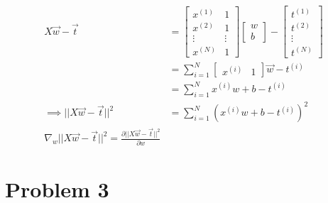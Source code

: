 \documentclass{article}
\begin{document}
\subsection{}

\begin{align*}
X\vec{w} - \vec{t} &=  \begin{bmatrix} x^{(1)} & 1 \\ x^{(2)} & 1 \\ \vdots & \vdots \\ x^{(N)} & 1 \end{bmatrix}  \begin{bmatrix} w \\ b \end{bmatrix} -  \begin{bmatrix} t^{(1)} \\ t^{(2)} \\ \vdots \\ t^{(N)} \end{bmatrix} \\
&= \sum_{i=1}^N  \begin{bmatrix} x^{(i)} & 1 \end{bmatrix} \vec{w} - t^{(i)} \\
&= \sum_{i=1}^N  x^{(i)} w + b - t^{(i)} \\
\implies || X\vec{w} - \vec{t} ||^2 &= \sum_{i=1}^N  (x^{(i)} w + b - t^{(i)})^2 \\
\nabla_w  || X\vec{w} - \vec{t} ||^2 = \frac{\partial || X\vec{w} - \vec{t} ||^2}{\partial w}
\end{align*}




\subsection{}
\subsection{}
\subsection{}


\section{Problem 3}
\subsection{}
\subsection{}
\subsection{}
\subsection{}
\subsection{}
\subsection{}
\end{document}
